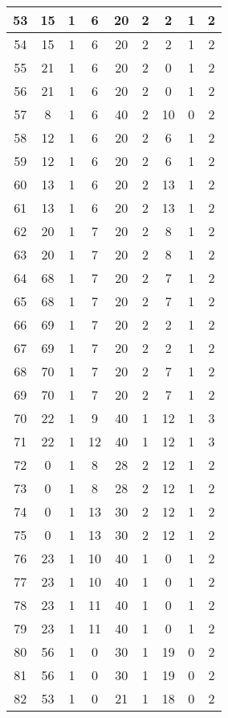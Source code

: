 \begin{apendices}
{\begin{longtable}{|c|c|c|c|c|c|c|c|c|}
53 & 15 & 1 & 6 & 20 & 2 & 2 & 1 & 2 \\ \hline
54 & 15 & 1 & 6 & 20 & 2 & 2 & 1 & 2 \\ \hline
55 & 21 & 1 & 6 & 20 & 2 & 0 & 1 & 2 \\ \hline
56 & 21 & 1 & 6 & 20 & 2 & 0 & 1 & 2 \\ \hline
57 & 8 & 1 & 6 & 40 & 2 & 10 & 0 & 2 \\ \hline
58 & 12 & 1 & 6 & 20 & 2 & 6 & 1 & 2 \\ \hline
59 & 12 & 1 & 6 & 20 & 2 & 6 & 1 & 2 \\ \hline
60 & 13 & 1 & 6 & 20 & 2 & 13 & 1 & 2 \\ \hline
61 & 13 & 1 & 6 & 20 & 2 & 13 & 1 & 2 \\ \hline
62 & 20 & 1 & 7 & 20 & 2 & 8 & 1 & 2 \\ \hline
63 & 20 & 1 & 7 & 20 & 2 & 8 & 1 & 2 \\ \hline
64 & 68 & 1 & 7 & 20 & 2 & 7 & 1 & 2 \\ \hline
65 & 68 & 1 & 7 & 20 & 2 & 7 & 1 & 2 \\ \hline
66 & 69 & 1 & 7 & 20 & 2 & 2 & 1 & 2 \\ \hline
67 & 69 & 1 & 7 & 20 & 2 & 2 & 1 & 2 \\ \hline
68 & 70 & 1 & 7 & 20 & 2 & 7 & 1 & 2 \\ \hline
69 & 70 & 1 & 7 & 20 & 2 & 7 & 1 & 2 \\ \hline
70 & 22 & 1 & 9 & 40 & 1 & 12 & 1 & 3 \\ \hline
71 & 22 & 1 & 12 & 40 & 1 & 12 & 1 & 3 \\ \hline
72 & 0 & 1 & 8 & 28 & 2 & 12 & 1 & 2 \\ \hline
73 & 0 & 1 & 8 & 28 & 2 & 12 & 1 & 2 \\ \hline
74 & 0 & 1 & 13 & 30 & 2 & 12 & 1 & 2 \\ \hline
75 & 0 & 1 & 13 & 30 & 2 & 12 & 1 & 2 \\ \hline
76 & 23 & 1 & 10 & 40 & 1 & 0 & 1 & 2 \\ \hline
77 & 23 & 1 & 10 & 40 & 1 & 0 & 1 & 2 \\ \hline
78 & 23 & 1 & 11 & 40 & 1 & 0 & 1 & 2 \\ \hline
79 & 23 & 1 & 11 & 40 & 1 & 0 & 1 & 2 \\ \hline
80 & 56 & 1 & 0 & 30 & 1 & 19 & 0 & 2 \\ \hline
81 & 56 & 1 & 0 & 30 & 1 & 19 & 0 & 2 \\ \hline
82 & 53 & 1 & 0 & 21 & 1 & 18 & 0 & 2 \\ \hline

\end{longtable}}
\end{apendices}
